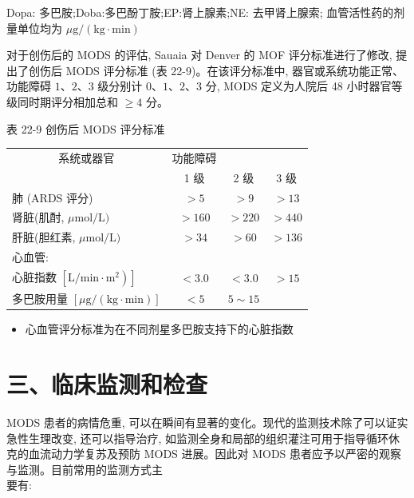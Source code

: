 \documentclass[10pt]{article}
\begin{document}
Dopa: 多巴胺;Doba:多巴酚丁胺;EP:肾上腺素;NE: 去甲肾上腺索; 血管活性药的剂量单位均为 $\mu \mathrm{g} /(\mathrm{kg} \cdot \mathrm{min})$

对于创伤后的 MODS 的评估, Sauaia 对 Denver 的 MOF 评分标准进行了修改, 提出了创伤后 MODS 评分标准 (表 22-9)。在该评分标准中, 器官或系统功能正常、功能障碍 $1 、 2 、 3$ 级分别计 $0 、 1 、 2 、 3$ 分, MODS 定义为人院后 48 小时器官等级同时期评分相加总和 $\geqslant 4$ 分。

表 22-9 创伤后 MODS 评分标准

\begin{center}
\begin{tabular}{lccc}
\hline
\multicolumn{1}{c}{系统或器官} & \multicolumn{1}{c}{功能障碍} &  &  \\
\cline { 2 - 4 }
 & 1 级 & 2 级 & 3 级 \\
\hline
肺 (ARDS 评分) & $>5$ & $>9$ & $>13$ \\
肾脏(肌酎, $\mu \mathrm{mol} / \mathrm{L})$ & $>160$ & $>220$ & $>440$ \\
肝脏(胆红素, $\mu \mathrm{mol} / \mathrm{L})$ & $>34$ & $>60$ & $>136$ \\
心血管: &  &  &  \\
心脏指数 $\left.\left[\mathrm{L} / \mathrm{min} \cdot \mathrm{m}^{2}\right)\right]$ & $<3.0$ & $<3.0$ & $>15$ \\
多巴胺用量 $[\mu \mathrm{g} /(\mathrm{kg} \cdot \mathrm{min})]$ & $<5$ & $5 \sim 15$ &  \\
\hline
\end{tabular}
\end{center}

\begin{itemize}
  \item 心血管评分标准为在不同剂星多巴胺支持下的心脏指数
\end{itemize}

\section*{三、临床监测和检查}
MODS 患者的病情危重, 可以在瞬间有显著的变化。现代的监测技术除了可以证实急性生理改变, 还可以指导治疗, 如监测全身和局部的组织灌注可用于指导循环休克的血流动力学复苏及预防 MODS 进展。因此对 MODS 患者应予以严密的观察与监测。目前常用的监测方式主\\
要有:
\end{document}
